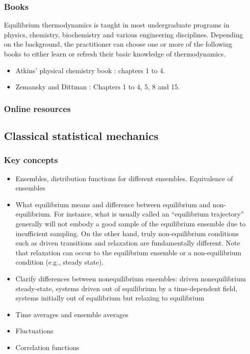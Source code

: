 \documentclass[9pt,bestpractices]{livecoms}
\begin{document}
\subsubsection{Books}
Equilibrium thermodynamics is taught in most undergraduate programs in physics, chemistry, biochemistry and various engineering disciplines.
Depending on the background, the practitioner can choose one or more of the following books to either learn or refresh their basic knowledge of thermodynamics. 
\begin{itemize}
\item Atkins' physical chemistry book \cite{AtkinsBook} : chapters 1 to 4.
\item Zemansky and Dittman \cite{ZemanskyBook}: Chapters 1 to 4, 5, 8 and 15.
\end{itemize}
\subsubsection{Online resources}

\subsection{Classical statistical mechanics}
\label{sec:stat_mech}
\subsubsection{Key concepts}
\begin{itemize}
\item Ensembles, distribution functions for different ensembles. Equivalence of ensembles
\item What equilibrium means and difference between equilibrium and
    non-equilibrium.
    For instance, what is usually called an ``equilibrium trajectory'' generally will not embody a good sample of the equilibrium ensemble due to insufficient sampling.  
        On the other hand, truly non-equilibrium conditions such as driven transitions and relaxation are fundamentally different. 
        Note that relaxation can occur to the equilibrium ensemble or a non-equilibrium condition (e.g., steady state).
\item Clarify differences between nonequilibrium ensembles: driven
    nonequilibrium steady-state, systems driven out of equilibrium by a time-dependent field, systems initially out of equilibrium but relaxing
        to equilibrium
\item Time averages and ensemble averages
\item Fluctuations
\item Correlation functions
\end{itemize}
\end{document}

